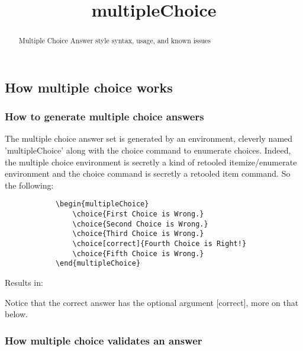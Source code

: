 \documentclass{ximera}
\title{multipleChoice}
\begin{document}
\begin{abstract}
    Multiple Choice Answer style syntax, usage, and known issues 
\end{abstract}
\maketitle


\subsection*{How multiple choice works}

    

    \subsubsection*{How to generate multiple choice answers}
    
        The multiple choice answer set is generated by an environment, cleverly named 'multipleChoice' along with the choice command to enumerate choices. Indeed, the multiple choice environment is secretly a kind of retooled itemize/enumerate environment and the choice command is secretly a retooled item command. So the following:
        \begin{verbatim}
            \begin{multipleChoice}
                \choice{First Choice is Wrong.}
                \choice{Second Choice is Wrong.}
                \choice{Third Choice is Wrong.}
                \choice[correct]{Fourth Choice is Right!}
                \choice{Fifth Choice is Wrong.}
            \end{multipleChoice}
        \end{verbatim}
        Results in:
        \begin{multipleChoice}
        \end{multipleChoice}
        
        Notice that the correct answer has the optional argument [correct], more on that below.
        
        
    \subsubsection*{How multiple choice validates an answer}
    
\end{document}
